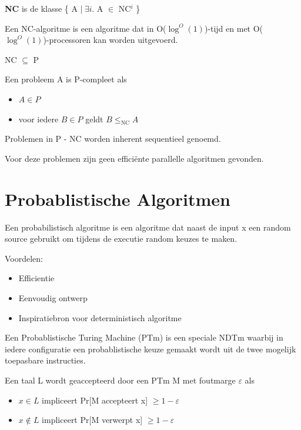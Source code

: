\documentclass[]{article}
\begin{document}
\textbf{NC} is de klasse \{ A $ | ~ \exists i$. A $\in$ NC$^i$ \}

\medskip

Een NC-algoritme is een algoritme dat in O($\log^O(1)$)-tijd en met O($\log^O(1)$)-processoren kan worden uitgevoerd.

\medskip

NC $\subseteq$ P

\medskip

Een probleem A is P-compleet als
\begin{itemize}
\item $A \in P$
\item voor iedere $B \in P$ geldt $B \leq_\text{NC} A$
\end{itemize}

\medskip 

Problemen in P - NC worden inherent sequentieel genoemd.

Voor deze problemen zijn geen effici\"ente parallelle algoritmen gevonden.

\section*{Probablistische Algoritmen}

Een probabilistisch algoritme is een algoritme dat naast de input x een random source gebruikt om tijdens de executie random keuzes te maken.

\medskip

Voordelen:
\begin{itemize}
\item Efficientie
\item Eenvoudig ontwerp
\item Inspiratiebron voor deterministisch algoritme
\end{itemize}

\medskip

Een Probablistische Turing Machine (PTm) is een speciale NDTm waarbij in iedere configuratie een probablistische keuze gemaakt wordt uit de twee mogelijk toepasbare instructies.

\medskip

Een taal L wordt geaccepteerd door een PTm M met foutmarge $\varepsilon$ als
\begin{itemize}
\item $x \in L$ impliceert Pr[M accepteert x] $\geq 1 - \varepsilon$
\item $x \not\in L$ impliceert Pr[M verwerpt x] $\geq 1 - \varepsilon$
\end{itemize}
\end{document}
